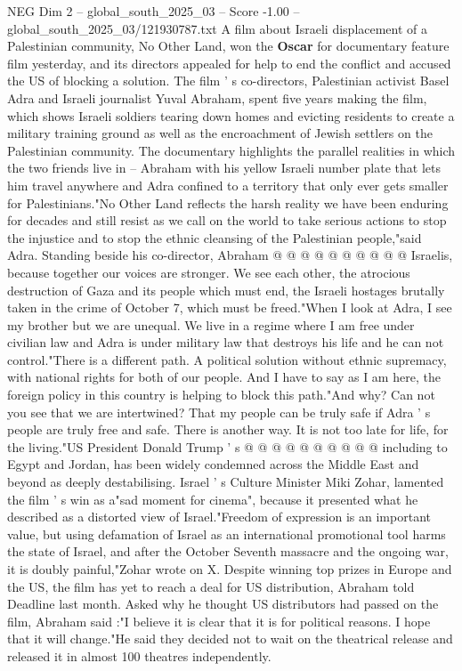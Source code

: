\begin{textsample}{NEG Dim 2 – global\_south\_2025\_03 – Score -1.00 – global\_south\_2025\_03/121930787.txt}  \label{ex:f2_neg_156}
A film about Israeli displacement of a Palestinian community, No Other Land, won the \textbf{Oscar} for documentary feature film yesterday, and its directors appealed for help to end the conflict and accused the US of blocking a solution.
The film ' s co-directors, Palestinian activist Basel Adra and Israeli journalist Yuval Abraham, spent five years making the film, which shows Israeli soldiers tearing down homes and evicting residents to create a military training ground as well as the encroachment of Jewish settlers on the Palestinian community.
The documentary highlights the parallel realities in which the two friends live in -- Abraham with his yellow Israeli number plate that lets him travel anywhere and Adra confined to a territory that only ever gets smaller for Palestinians."No Other Land reflects the harsh reality we have been enduring for decades and still resist as we call on the world to take serious actions to stop the injustice and to stop the ethnic cleansing of the Palestinian people,"said Adra.
Standing beside his co-director, Abraham @ @ @ @ @ @ @ @ @ @ Israelis, because together our voices are stronger.
We see each other, the atrocious destruction of Gaza and its people which must end, the Israeli hostages brutally taken in the crime of October 7, which must be freed."When I look at Adra, I see my brother but we are unequal.
We live in a regime where I am free under civilian law and Adra is under military law that destroys his life and he can not control."There is a different path.
A political solution without ethnic supremacy, with national rights for both of our people.
And I have to say as I am here, the foreign policy in this country is helping to block this path."And why?
Can not you see that we are intertwined?
That my people can be truly safe if Adra ' s people are truly free and safe.
There is another way.
It is not too late for life, for the living."US President Donald Trump ' s @ @ @ @ @ @ @ @ @ @ including to Egypt and Jordan, has been widely condemned across the Middle East and beyond as deeply destabilising.
Israel ' s Culture Minister Miki Zohar, lamented the film ' s win as a"sad moment for cinema", because it presented what he described as a distorted view of Israel."Freedom of expression is an important value, but using defamation of Israel as an international promotional tool harms the state of Israel, and after the October Seventh massacre and the ongoing war, it is doubly painful,"Zohar wrote on X.
Despite winning top prizes in Europe and the US, the film has yet to reach a deal for US distribution, Abraham told Deadline last month.
Asked why he thought US distributors had passed on the film, Abraham said :"I believe it is clear that it is for political reasons.
I hope that it will change."He said they decided not to wait on the theatrical release and released it in almost 100 theatres independently.

\end{textsample}
